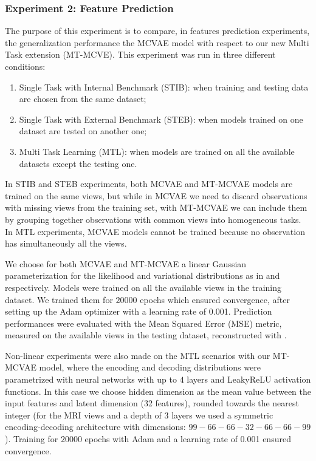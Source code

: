 \subsubsection{Experiment 2: Feature Prediction}
\label{ssec:feats}

The purpose of this experiment is to compare, in features prediction experiments, the generalization performance the MCVAE model with respect to our new Multi Task extension (MT-MCVE).
This experiment was run in three different conditions:
%
\begin{enumerate}
\item Single Task with Internal Benchmark (STIB): when training and testing data are chosen from the same dataset;
%
\item Single Task with External Benchmark (STEB): when models trained on one dataset are tested on another one;
%
\item Multi Task Learning (MTL): when models are trained on all the available datasets except the testing one.
%
\end{enumerate}
%
In STIB and STEB experiments, both MCVAE and MT-MCVAE models are trained on the same views,
but while in MCVAE we need to discard observations with missing views from the training set,
with MT-MCVAE we can include them by grouping together observations with common views into homogeneous tasks.
In MTL experiments, MCVAE models cannot be trained because no observation has simultaneously all the views.

We choose for both MCVAE and MT-MCVAE a linear Gaussian parameterization for the likelihood and variational distributions as in  and  respectively.
Models were trained on all the available views in the training dataset. %
We trained them for $20000$ epochs which ensured convergence, after setting up the Adam optimizer with a learning rate of 0.001.
Prediction performances were evaluated with the Mean Squared Error (MSE) metric, measured on the available views in the testing dataset, reconstructed with .

	Non-linear experiments were also made on the MTL scenarios with our MT-MCVAE model, where the encoding and decoding distributions were parametrized with neural networks with up to $4$ layers and LeakyReLU activation functions.
	In this case we choose hidden dimension as the mean value between the input features and latent dimension (32 features), rounded towards the nearest integer
	(\eg for the MRI views and a depth of $3$ layers we used a symmetric encoding-decoding architecture with dimensions: $99-66-66-32-66-66-99$).
	Training for $20000$ epochs with Adam and a learning rate of 0.001 ensured convergence.

